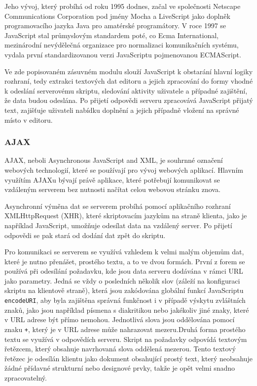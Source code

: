 \documentclass{article}
\begin{document}
Jeho vývoj, který probíhá od roku 1995 dodnes, začal ve společnosti Netscape Communications Corporation pod jmény Mocha a LiveScript jako doplněk programovacího jazyka Java pro amatérské programátory. V roce 1997 se JavaScript stal průmyslovým standardem poté, co Ecma International, mezinárodní nevýdělečná organizace pro normalizaci komunikačních systému, vydala první standardizovanou verzi JavaScriptu pojmenovanou ECMAScript. %

Ve zde popisovaném zásuvném modulu slouží JavaScript k obstarání hlavní logiky rozhraní, tedy extrakci textových dat editoru a jejich zpracování do formy vhodné k odeslání serverovému skriptu, sledování aktivity uživatele a případné zajištění, že data budou odeslána. Po přijetí odpovědi serveru zpracovává JavaScript přijatý text, zajišťuje uživateli nabídku doplnění a jejich případně vložení na správné místo v editoru. 

\subsubsection{AJAX}

AJAX, neboli Asynchronous JavaScript and XML, je souhrnné označení webových technologií, které se používají pro vývoj webových aplikací. Hlavním využítím AJAXu bývají právě aplikace, které potřebují komunikovat se vzdáleným serverem bez nutnosti načítat celou webovou stránku znova. 

Asynchronní výměna dat se serverem probíhá pomocí aplikačního rozhraní XMLHttpRequest (XHR), které skriptovacím jazykům na straně klienta, jako je například JavaScript, umožňuje odesílat data na vzdálený server. Po přijetí odpovědi se pak stará od dodání dat zpět do skriptu.

Pro komunikaci se serverem se využívá vzhledem k velmi malým objemům dat, které je nutno přenášet, prostého textu, a to ve dvou formách. První z forem se používá při odesílání požadavku, kde jsou data serveru dodávána v rámci URL jako parametry. Jedná se vždy o posledních několik slov (záleží na konfiguraci skriptu na klientově straně), která jsou zakódována globální funkcí JavaScriptu {\tt encodeURI}, aby byla zajištěna správná funkčnost i v případě výskytu zvláštních znaků, jako jsou například písmena s diakritikou nebo jakékoliv jiné znaky, které v URL adrese být přímo nemohou. Jednotlivá slova jsou oddělována pomocí znaku {\tt +}, který je v URL adrese může nahrazovat mezeru.Druhá forma prostého textu se využívá v odpovědích serveru. Skript na požadavky odpovídá textovým řetězcem, který obsahuje navrhovaná slova oddělená mezerou. Tento textový řetězec je odesílán klientu jako dokument obsahující prostý text, který neobsahuje žádné přídavné strukturní nebo designové prvky, takže je opět velmi snadno zpracovatelný.
\end{document}
